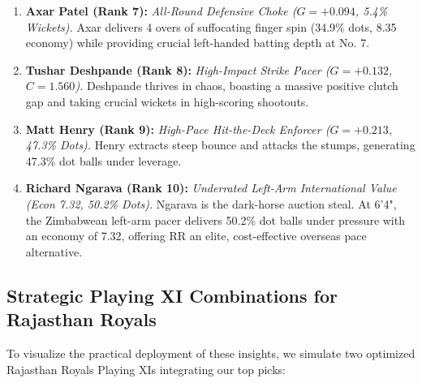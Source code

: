 \documentclass[11pt,a4paper]{article}
\begin{document}
\begin{enumerate}
    \item \textbf{Axar Patel (Rank 7):} \textit{All-Round Defensive Choke ($G = +0.094$, 5.4\% Wickets).} Axar delivers 4 overs of suffocating finger spin (34.9\% dots, 8.35 economy) while providing crucial left-handed batting depth at No. 7.
    \item \textbf{Tushar Deshpande (Rank 8):} \textit{High-Impact Strike Pacer ($G = +0.132$, $C = 1.560$).} Deshpande thrives in chaos, boasting a massive positive clutch gap and taking crucial wickets in high-scoring shootouts.
    \item \textbf{Matt Henry (Rank 9):} \textit{High-Pace Hit-the-Deck Enforcer ($G = +0.213$, 47.3\% Dots).} Henry extracts steep bounce and attacks the stumps, generating 47.3\% dot balls under leverage.
    \item \textbf{Richard Ngarava (Rank 10):} \textit{Underrated Left-Arm International Value (Econ 7.32, 50.2\% Dots).} Ngarava is the dark-horse auction steal. At 6'4", the Zimbabwean left-arm pacer delivers 50.2\% dot balls under pressure with an economy of 7.32, offering RR an elite, cost-effective overseas pace alternative.
\end{enumerate}

\subsection{Strategic Playing XI Combinations for Rajasthan Royals}
To visualize the practical deployment of these insights, we simulate two optimized Rajasthan Royals Playing XIs integrating our top picks:
\end{document}
